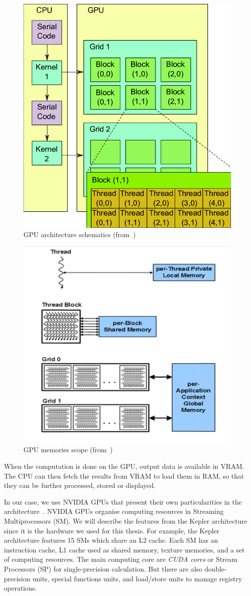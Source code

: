 \begin{figure}[h]
	\centering
	\includegraphics[width=0.6\linewidth]{gpu-arch}
	\caption{GPU architecture schematics (from~\cite{Bartezzaghi:gpu-arch})}
	\label{fig:gpu-arch}
\end{figure}

\begin{figure}[h]
	\centering
	\includegraphics[width=0.6\linewidth]{gpu-memory-scope}
	\caption{GPU memories scope (from~\cite{nvidia:keplerarch})}
	\label{fig:gpu-memory-scope}
\end{figure}

When the computation is done on the GPU, output data is available in VRAM. The CPU can then fetch the results from VRAM to load them in RAM, so that they can be further processed, stored or displayed.

In our case, we use NVIDIA GPUs that present their own particularities in the architecture~\cite{nvidia:keplerarch}. NVIDIA GPUs organise computing resources in Streaming Multiprocessors (SM). We will describe the features from the Kepler architecture since it is the hardware we used for this thesis. For example, the Kepler architecture features 15 SMs which share an L2 cache. Each SM has an instruction cache, L1 cache used as shared memory, texture memories, and a set of computing resources. The main computing core are \emph{CUDA cores} or Stream Processors (SP) for single-precision calculation. But there are also double-precision units, special functions units, and load/store units to manage registry operations. 

